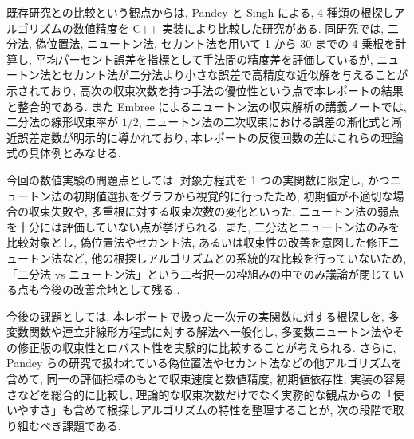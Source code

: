 \documentclass[a4paper,fontsize=11pt,line_length=40zw,number_of_lines=35,baselineskip=1.7zw]{jlreq}
\begin{document}
既存研究との比較という観点からは, Pandey と Singh による, 4 種類の根探しアルゴリズムの数値精度を C++ 実装により比較した研究がある.\cite{pandey2024ComparisonNumericalAccuracy}
同研究では, 二分法, 偽位置法, ニュートン法, セカント法を用いて 1 から 30 までの 4 乗根を計算し, 平均パーセント誤差を指標として手法間の精度差を評価しているが, ニュートン法とセカント法が二分法より小さな誤差で高精度な近似解を与えることが示されており, 高次の収束次数を持つ手法の優位性という点で本レポートの結果と整合的である.\cite{pandey2024ComparisonNumericalAccuracy}
また Embree によるニュートン法の収束解析の講義ノートでは, 二分法の線形収束率が $1/2$, ニュートン法の二次収束における誤差の漸化式と漸近誤差定数が明示的に導かれており, 本レポートの反復回数の差はこれらの理論式の具体例とみなせる.\cite{embree2020Lecture30}

今回の数値実験の問題点としては, 対象方程式を 1 つの実関数に限定し, かつニュートン法の初期値選択をグラフから視覚的に行ったため, 初期値が不適切な場合の収束失敗や, 多重根に対する収束次数の変化といった, ニュートン法の弱点を十分には評価していない点が挙げられる.\cite{embree2020Lecture30} 
また, 二分法とニュートン法のみを比較対象とし, 偽位置法やセカント法, あるいは収束性の改善を意図した修正ニュートン法など, 他の根探しアルゴリズムとの系統的な比較を行っていないため, 「二分法 vs ニュートン法」という二者択一の枠組みの中でのみ議論が閉じている点も今後の改善余地として残る.\cite{pandey2024ComparisonNumericalAccuracy}.

今後の課題としては, 本レポートで扱った一次元の実関数に対する根探しを, 多変数関数や連立非線形方程式に対する解法へ一般化し, 多変数ニュートン法やその修正版の収束性とロバスト性を実験的に比較することが考えられる.\cite{gavva2020NUMERICALANALYSIS} 
さらに, Pandey らの研究で扱われている偽位置法やセカント法などの他アルゴリズムを含めて, 同一の評価指標のもとで収束速度と数値精度, 初期値依存性, 実装の容易さなどを総合的に比較し, 理論的な収束次数だけでなく実務的な観点からの「使いやすさ」も含めて根探しアルゴリズムの特性を整理することが, 次の段階で取り組むべき課題である.\cite{pandey2024ComparisonNumericalAccuracy}

\printbibliography[title=参考文献]
\end{document}
